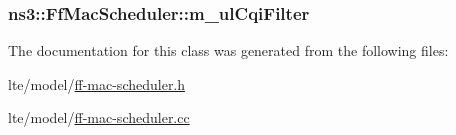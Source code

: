 \subsubsection[{\texorpdfstring{m\+\_\+ul\+Cqi\+Filter}{m_ulCqiFilter}}]{ ns3\+::\+Ff\+Mac\+Scheduler\+::m\+\_\+ul\+Cqi\+Filter\hspace{0.3cm}{\ttfamily [protected]}}\hypertarget{classns3_1_1FfMacScheduler_adae16e66a1c4231da80a1221297442cf}{}\label{classns3_1_1FfMacScheduler_adae16e66a1c4231da80a1221297442cf}


The documentation for this class was generated from the following files\+:\begin{DoxyCompactItemize}
\item 
lte/model/\hyperlink{ff-mac-scheduler_8h}{ff-\/mac-\/scheduler.\+h}\item 
lte/model/\hyperlink{ff-mac-scheduler_8cc}{ff-\/mac-\/scheduler.\+cc}\end{DoxyCompactItemize}

